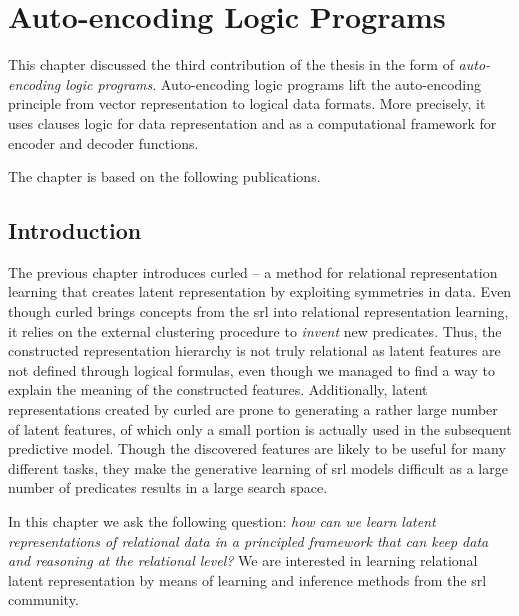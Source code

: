 \chapter{Auto-encoding Logic Programs}\label{ch:alps}


This chapter discussed the third contribution of the thesis in the form of \textit{auto-encoding logic programs}.
Auto-encoding logic programs lift the auto-encoding principle from vector representation to logical data formats.
More precisely, it uses clauses logic for data representation and  as a computational framework for encoder and decoder functions.


The chapter is based on the following publications.

\begin{quote}
\end{quote}

\begin{quote}
\end{quote}



\section{Introduction}




The previous chapter introduces \gls{curled} -- a method for relational representation learning that creates latent representation by exploiting symmetries in data.
Even though \gls{curled} brings concepts from the \gls{srl} into relational representation learning, it relies on the external clustering procedure to \textit{invent} new predicates.
Thus, the constructed representation hierarchy  is not truly relational as latent features are not defined through logical formulas, even though we managed to find a way to explain the meaning of the constructed features.
Additionally, latent representations created by \gls{curled} are prone to generating a rather large number of latent features, of which only a small portion  is actually used in the subsequent predictive model.
Though the discovered features are likely to be useful for many different tasks, they make the generative learning of \gls{srl} models difficult as a large number of predicates results in a large search space.





In this chapter we ask the following question: \textit{how can we learn latent representations of relational data in a principled framework that can keep data and reasoning at the relational level?}
We are interested in learning relational latent representation by means of learning and inference methods from the \gls{srl} community.



